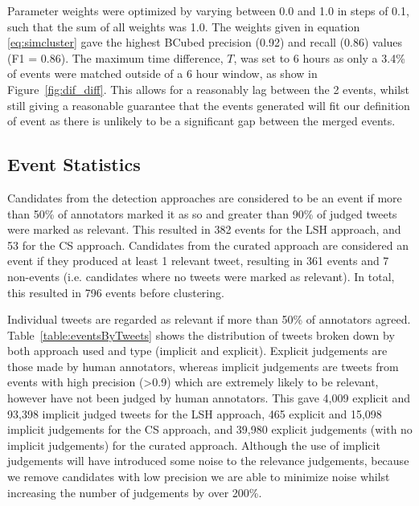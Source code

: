 Parameter weights were optimized by varying between 0.0 and 1.0 in steps of 0.1, such that the sum of all weights was 1.0.
The weights given in equation \ref{eq:simcluster} gave the highest BCubed precision (0.92) and recall (0.86) values (F1 = 0.86).
The maximum time difference, $T$, was set to 6 hours  as only a 3.4\% of events were matched outside of a 6 hour window, as show in Figure~\ref{fig:dif_diff}.
This allows for a reasonably lag between the 2 events, whilst still giving a reasonable guarantee that the events generated will fit our definition of event as there is unlikely to be a significant gap between the merged events.


\subsection{Event Statistics}

Candidates from the detection approaches are considered to be an event if more than 50\% of annotators marked it as so and greater than 90\% of judged tweets were marked as relevant.
This resulted in 382 events for the LSH approach, and 53 for the CS approach.
Candidates from the curated approach are considered an event if they produced at least 1 relevant tweet, resulting in 361 events and 7 non-events (i.e. candidates where no tweets were marked as relevant).
In total, this resulted in 796 events before clustering.

Individual tweets are regarded as relevant if more than 50\% of annotators agreed.
Table~\ref{table:eventsByTweets} shows the distribution of tweets broken down by both approach used and type (implicit and explicit).
Explicit judgements are those made by human annotators, whereas implicit judgements are  tweets from events with high precision (\textgreater 0.9) which are extremely likely to be relevant, however have not been judged by human annotators.
This gave 4,009 explicit and 93,398 implicit judged tweets for the LSH approach, 465 explicit and 15,098 implicit judgements for the CS approach, and 39,980 explicit judgements (with no implicit judgements) for the curated approach.
Although the use of implicit judgements will have introduced some noise to the relevance judgements, because we remove candidates with low precision we are able to minimize noise whilst increasing the number of judgements by over 200\%.

